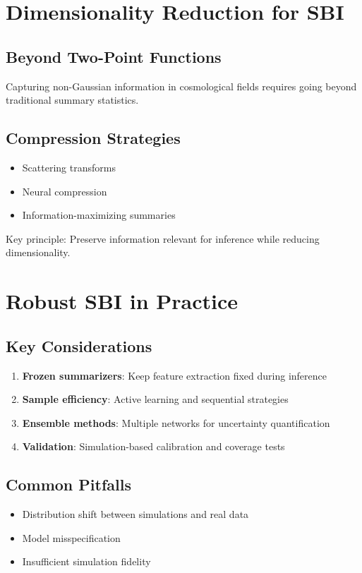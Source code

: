 \documentclass[11pt,a4paper]{article}
\theoremstyle{definition}
\begin{document}
\section{Dimensionality Reduction for SBI}

\subsection{Beyond Two-Point Functions}
Capturing non-Gaussian information in cosmological fields requires going beyond traditional summary statistics.

\subsection{Compression Strategies}
\begin{itemize}
    \item Scattering transforms
    \item Neural compression
    \item Information-maximizing summaries
\end{itemize}

Key principle: Preserve information relevant for inference while reducing dimensionality.

\section{Robust SBI in Practice}

\subsection{Key Considerations}
\begin{enumerate}
    \item \textbf{Frozen summarizers}: Keep feature extraction fixed during inference
    \item \textbf{Sample efficiency}: Active learning and sequential strategies
    \item \textbf{Ensemble methods}: Multiple networks for uncertainty quantification
    \item \textbf{Validation}: Simulation-based calibration and coverage tests
\end{enumerate}

\subsection{Common Pitfalls}
\begin{itemize}
    \item Distribution shift between simulations and real data
    \item Model misspecification
    \item Insufficient simulation fidelity
\end{itemize}
\end{document}
